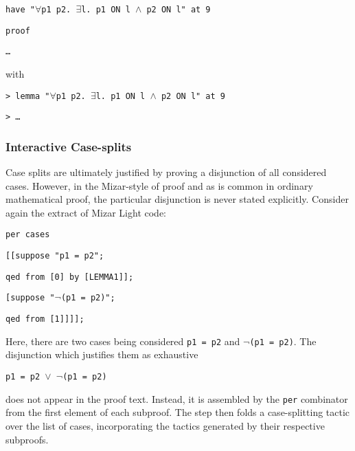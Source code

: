 \vspace{0.5cm}
\begin{minipage}{\linewidth}
  \texttt{have "$\forall$p1 p2. $\exists$l. p1 ON l $\wedge$ p2 ON l" at 9}

  \texttt{proof}

  \texttt{\enspace \ldots}
\end{minipage}
\vspace{0.5cm}

\noindent with

\vspace{0.5cm}
\begin{minipage}{\linewidth}
  \texttt{> lemma "$\forall$p1 p2. $\exists$l. p1 ON l $\wedge$ p2 ON l" at 9}

  \texttt{> \enspace \ldots}
\end{minipage}
\vspace{0.5cm}

\subsubsection{Interactive Case-splits}
Case splits are ultimately justified by proving a disjunction of all considered cases. However, in the Mizar-style of proof and as is common in ordinary mathematical proof, the particular disjunction is never stated explicitly. Consider again the extract of Mizar Light code:

\vspace{0.5cm}
\begin{minipage}{\linewidth}
  \footnotesize
  \texttt{\quad per cases}

  \texttt{\quad\enspace[[suppose "p1 = p2";}

  \texttt{\qquad\enspace qed from [0] by [LEMMA1]];}

  \texttt{\qquad [suppose "$\neg$(p1 = p2)";}

  \texttt{\qquad\enspace qed from [1]]]];}
\end{minipage}
\vspace{0.5cm}

{\samepage Here, there are two cases being considered \texttt{p1 = p2} and \texttt{$\neg$(p1 = p2)}. The disjunction which justifies them as exhaustive
\begin{center}\texttt{p1 = p2 $\vee$ $\neg$(p1 = p2)}\end{center}}

\noindent does not appear in the proof text. Instead, it is assembled by the \texttt{per} combinator from the first element of each subproof. The step then folds a case-splitting tactic over the list of cases, incorporating the tactics generated by their respective subproofs.

